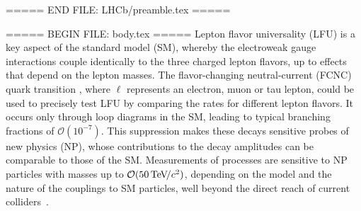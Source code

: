 

\fi


\usepackage{cite}
\usepackage{LHCb/mciteplus}
===== END FILE: LHCb/preamble.tex =====

===== BEGIN FILE: body.tex =====
Lepton flavor universality (LFU) is a key aspect of the standard model (SM), whereby the electroweak gauge interactions couple identically to the three charged lepton flavors, up to effects that depend on the lepton masses.
The flavor-changing neutral-current (FCNC) quark transition \bsll, where $\ell$ represents an electron, muon or tau lepton, could be used to precisely test LFU by comparing the rates for different lepton flavors. It occurs only through loop diagrams in the SM, leading to typical
branching fractions of $\mathcal{O}(10^{-7})$. This suppression makes these decays sensitive probes of new physics (NP), whose contributions to the decay
amplitudes can be comparable to those of the SM. Measurements of \bsll processes are sensitive to NP particles with masses up to $\mathcal{O}(50\text{\,Te\kern -0.1em V\!/}c^2)$, depending on the model and the nature of the couplings to SM  particles, well beyond the direct reach of current colliders~\cite{LHCb-PII-Physics}.

